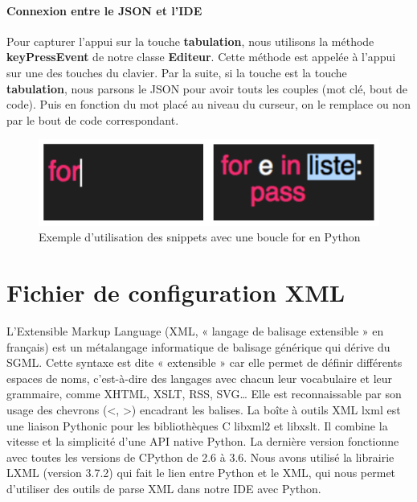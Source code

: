 \documentclass[a4paper,12pt]{article}
\begin{document}
		\paragraph{Connexion entre le JSON et l'IDE}

			Pour capturer l'appui sur la touche \textbf{tabulation}, nous utilisons la méthode \textbf{keyPressEvent} de notre classe \textbf{Editeur}. Cette méthode est appelée à l'appui sur une des touches du clavier. Par la suite, si la touche est la touche \textbf{tabulation}, nous parsons le JSON pour avoir touts les couples (mot clé, bout de code). Puis en fonction du mot placé au niveau du curseur, on le remplace ou non par le bout de code correspondant.

			\begin{figure}[h!]
				\begin{center}
					\includegraphics[scale=0.7]{images/exampleFor}
					\caption{Exemple d'utilisation des snippets avec une boucle for en Python}
				\end{center}
			\end{figure}

\section{Fichier de configuration XML}

L'Extensible Markup Language (XML, « langage de balisage extensible » en français) est un métalangage informatique de balisage générique qui dérive du SGML. Cette syntaxe est dite « extensible » car elle permet de définir différents espaces de noms, c'est-à-dire des langages avec chacun leur vocabulaire et leur grammaire, comme XHTML, XSLT, RSS, SVG… Elle est reconnaissable par son usage des chevrons (<, >) encadrant les balises. 
La boîte à outils XML lxml est une liaison Pythonic pour les bibliothèques C libxml2 et libxslt. Il combine la vitesse et la simplicité d'une API native Python. La dernière version fonctionne avec toutes les versions de CPython de 2.6 à 3.6. Nous avons utilisé la librairie LXML (version 3.7.2) qui fait le lien entre Python et le XML, qui nous permet d'utiliser des outils de parse XML dans notre IDE avec Python. 
\end{document}
